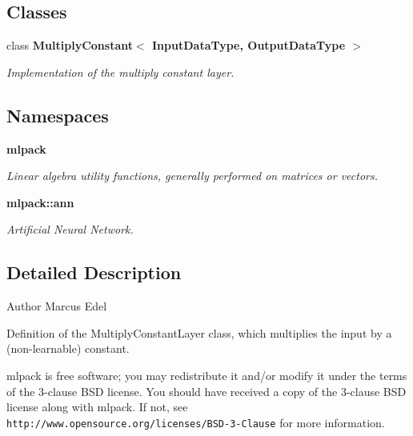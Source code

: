 \subsection*{Classes}
\begin{DoxyCompactItemize}
\item 
class \textbf{ Multiply\+Constant$<$ Input\+Data\+Type, Output\+Data\+Type $>$}
\begin{DoxyCompactList}\small\item\em Implementation of the multiply constant layer. \end{DoxyCompactList}\end{DoxyCompactItemize}
\subsection*{Namespaces}
\begin{DoxyCompactItemize}
\item 
 \textbf{ mlpack}
\begin{DoxyCompactList}\small\item\em Linear algebra utility functions, generally performed on matrices or vectors. \end{DoxyCompactList}\item 
 \textbf{ mlpack\+::ann}
\begin{DoxyCompactList}\small\item\em Artificial Neural Network. \end{DoxyCompactList}\end{DoxyCompactItemize}


\subsection{Detailed Description}
\begin{DoxyAuthor}{Author}
Marcus Edel
\end{DoxyAuthor}
Definition of the Multiply\+Constant\+Layer class, which multiplies the input by a (non-\/learnable) constant.

mlpack is free software; you may redistribute it and/or modify it under the terms of the 3-\/clause B\+SD license. You should have received a copy of the 3-\/clause B\+SD license along with mlpack. If not, see {\tt http\+://www.\+opensource.\+org/licenses/\+B\+S\+D-\/3-\/\+Clause} for more information. 